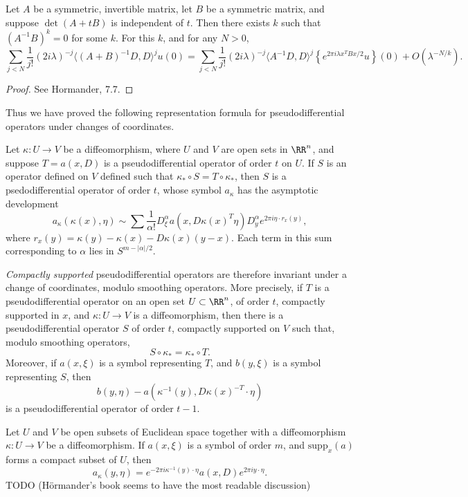 \begin{lemma}
    Let $A$ be a symmetric, invertible matrix, let $B$ be a symmetric matrix, and suppose $\det(A + tB)$ is independent of $t$. Then there exists $k$ such that $(A^{-1}B)^k = 0$ for some $k$. For this $k$, and for any $N > 0$,
    \[ \sum_{j < N} \frac{1}{j!} (2 i \lambda)^{-j} \langle (A + B)^{-1} D, D \rangle^j u(0) = \sum_{j < N} \frac{1}{j!} (2 i \lambda)^{-j} \langle A^{-1}D, D \rangle^j \left\{ e^{2 \pi i \lambda x^T B x / 2} u \right\}(0) + O(\lambda^{-N/k}). \]
\end{lemma}
\begin{proof}
    See Hormander, 7.7.
\end{proof}

Thus we have proved the following representation formula for pseudodifferential operators under changes of coordinates.

\begin{theorem}
    Let $\kappa: U \to V$ be a diffeomorphism, where $U$ and $V$ are open sets in $\RR^n$, and suppose $T = a(x,D)$ is a pseudodifferential operator of order $t$ on $U$. If $S$ is an operator defined on $V$ defined such that $\kappa_* \circ S = T \circ \kappa_*$, then $S$ is a psedodifferential operator of order $t$, whose symbol $a_\kappa$ has the asymptotic development
    \[ a_\kappa(\kappa(x),\eta) \sim \sum \frac{1}{\alpha!} D^\alpha_\xi a(x,D\kappa(x)^T \eta) D^\alpha_y e^{2\pi i \eta \cdot r_x(y)}, \]
    where $r_x(y) = \kappa(y) - \kappa(x) - D\kappa(x)(y-x)$. Each term in this sum corresponding to $\alpha$ lies in $S^{m-|\alpha|/2}$.
\end{theorem}

\emph{Compactly supported} pseudodifferential operators are therefore invariant under a change of coordinates, modulo smoothing operators. More precisely, if $T$ is a pseudodifferential operator on an open set $U \subset \RR^n$, of order $t$, compactly supported in $x$, and $\kappa: U \to V$ is a diffeomorphism, then there is a pseudodifferential operator $S$ of order $t$, compactly supported on $V$ such that, modulo smoothing operators,
%
\[ S \circ \kappa_* = \kappa_* \circ T. \]
%
Moreover, if $a(x,\xi)$ is a symbol representing $T$, and $b(y,\xi)$ is a symbol representing $S$, then
%
\[ b(y,\eta) - a(\kappa^{-1}(y), D\kappa(x)^{-T} \cdot \eta) \]
%
is a pseudodifferential operator of order $t - 1$.

\begin{theorem}
    Let $U$ and $V$ be open subsets of Euclidean space together with a diffeomorphism $\kappa: U \to V$ be a diffeomorphism. If $a(x,\xi)$ is a symbol of order $m$, and $\text{supp}_x(a)$ forms a compact subset of $U$, then
    \[ a_\kappa(y,\eta) = e^{-2 \pi i \kappa^{-1}(y) \cdot \eta} a(x,D) e^{2 \pi i y \cdot \eta}. \]
    TODO (H\"{o}rmander's book seems to have the most readable discussion)
\end{theorem}

